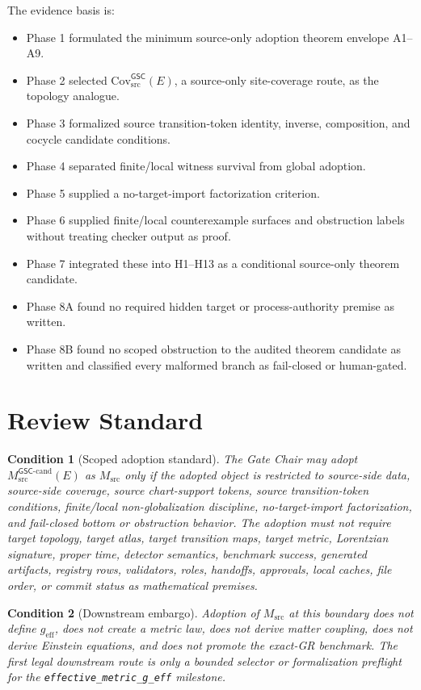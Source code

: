 \documentclass[11pt]{article}
\newcommand{\Msrc}{M_{\mathrm{src}}}
\newcommand{\Mgsccand}{M_{\mathrm{src}}^{\mathsf{GSC}\mbox{-}\mathrm{cand}}}
\newcommand{\CovSrc}{\mathrm{Cov}_{\mathrm{src}}^{\mathsf{GSC}}}
\newcommand{\geff}{g_{\mathrm{eff}}}
\newtheorem{condition}{Condition}
\begin{document}
The evidence basis is:
\begin{itemize}[leftmargin=*]
  \item Phase 1 formulated the minimum source-only adoption theorem envelope
  A1--A9.
  \item Phase 2 selected \(\CovSrc(E)\), a source-only site-coverage route,
  as the topology analogue.
  \item Phase 3 formalized source transition-token identity, inverse,
  composition, and cocycle candidate conditions.
  \item Phase 4 separated finite/local witness survival from global adoption.
  \item Phase 5 supplied a no-target-import factorization criterion.
  \item Phase 6 supplied finite/local counterexample surfaces and obstruction
  labels without treating checker output as proof.
  \item Phase 7 integrated these into H1--H13 as a conditional source-only
  theorem candidate.
  \item Phase 8A found no required hidden target or process-authority premise
  as written.
  \item Phase 8B found no scoped obstruction to the audited theorem candidate
  as written and classified every malformed branch as fail-closed or
  human-gated.
\end{itemize}

\section{Review Standard}

\begin{condition}[Scoped adoption standard]
The Gate Chair may adopt \(\Mgsccand(E)\) as \(\Msrc\) only if the adopted
object is restricted to source-side data, source-side coverage, source
chart-support tokens, source transition-token conditions, finite/local
non-globalization discipline, no-target-import factorization, and fail-closed
bottom or obstruction behavior. The adoption must not require target topology,
target atlas, target transition maps, target metric, Lorentzian signature,
proper time, detector semantics, benchmark success, generated artifacts,
registry rows, validators, roles, handoffs, approvals, local caches, file
order, or commit status as mathematical premises.
\end{condition}

\begin{condition}[Downstream embargo]
Adoption of \(\Msrc\) at this boundary does not define \(\geff\), does not
create a metric law, does not derive matter coupling, does not derive
Einstein equations, and does not promote the exact-GR benchmark. The first
legal downstream route is only a bounded selector or formalization preflight
for the \texttt{effective\_metric\_g\_eff} milestone.
\end{condition}
\end{document}
